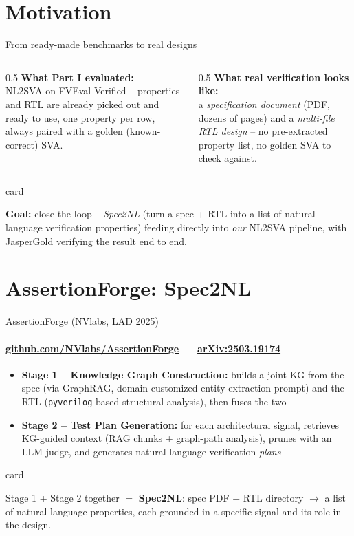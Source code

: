 \documentclass[aspectratio=169]{beamer}
\newenvironment{card}[1][\textwidth]{%
  \begin{beamercolorbox}[wd=#1,sep=8pt,rounded=true,shadow=false]{card}
}{%
  \end{beamercolorbox}
}
\begin{document}
\section{Motivation}

\begin{frame}{From ready-made benchmarks to real designs}
  \begin{columns}[T]
    \begin{column}{0.5\textwidth}
      \textbf{What Part I evaluated:} \\
      NL2SVA on FVEval-Verified -- properties and RTL are already picked
      out and ready to use, one property per row, always paired with a
      golden (known-correct) SVA.
    \end{column}
    \begin{column}{0.5\textwidth}
      \textbf{What real verification looks like:} \\
      a \emph{specification document} (PDF, dozens of pages) and a
      \emph{multi-file RTL design} -- no pre-extracted property list, no
      golden SVA to check against.
    \end{column}
  \end{columns}
  \vspace{10pt}
  \begin{card}
    \textbf{Goal:} close the loop -- \emph{Spec2NL} (turn a spec + RTL into a
    list of natural-language verification properties) feeding directly into
    \emph{our} NL2SVA pipeline, with JasperGold verifying the result end to
    end.
  \end{card}
\end{frame}

\section{AssertionForge: Spec2NL}

\begin{frame}{AssertionForge (NVlabs, LAD 2025)}
  \framesubtitle{\href{https://github.com/NVlabs/AssertionForge}{github.com/NVlabs/AssertionForge} --- \href{https://arxiv.org/abs/2503.19174}{arXiv:2503.19174}}
  \begin{itemize}
    \item \textbf{Stage 1 -- Knowledge Graph Construction:} builds a joint
      KG from the spec (via GraphRAG, domain-customized entity-extraction
      prompt) and the RTL (\texttt{pyverilog}-based structural analysis),
      then fuses the two
    \item \textbf{Stage 2 -- Test Plan Generation:} for each architectural
      signal, retrieves KG-guided context (RAG chunks + graph-path
      analysis), prunes with an LLM judge, and generates natural-language
      verification \emph{plans}
  \end{itemize}
  \vspace{8pt}
  \begin{card}
  \footnotesize
  Stage 1 + Stage 2 together $=$ \textbf{Spec2NL}: spec PDF + RTL directory
  $\rightarrow$ a list of natural-language properties, each grounded in a
  specific signal and its role in the design.
  \end{card}
\end{frame}
\end{document}

